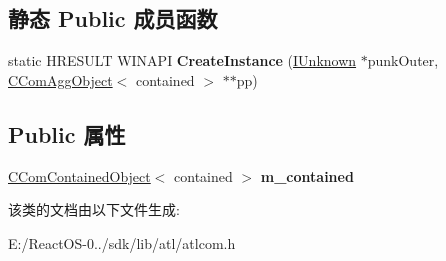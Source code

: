 \subsection*{静态 Public 成员函数}
\begin{DoxyCompactItemize}
\item 
\mbox{\label{class_a_t_l_1_1_c_com_agg_object_a21c7553691a9578076cd488f8286844e}} 
static H\+R\+E\+S\+U\+LT W\+I\+N\+A\+PI {\bfseries Create\+Instance} (\hyperlink{interface_i_unknown}{I\+Unknown} $\ast$punk\+Outer, \hyperlink{class_a_t_l_1_1_c_com_agg_object}{C\+Com\+Agg\+Object}$<$ contained $>$ $\ast$$\ast$pp)
\end{DoxyCompactItemize}
\subsection*{Public 属性}
\begin{DoxyCompactItemize}
\item 
\mbox{\label{class_a_t_l_1_1_c_com_agg_object_a0fbd8928cec814c14e8e8fc50f0e68b7}} 
\hyperlink{class_a_t_l_1_1_c_com_contained_object}{C\+Com\+Contained\+Object}$<$ contained $>$ {\bfseries m\+\_\+contained}
\end{DoxyCompactItemize}


该类的文档由以下文件生成\+:\begin{DoxyCompactItemize}
\item 
E\+:/\+React\+O\+S-\/0../sdk/lib/atl/atlcom.\+h\end{DoxyCompactItemize}
